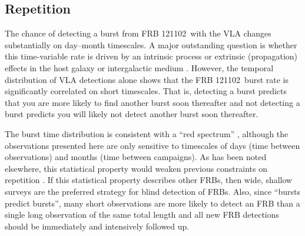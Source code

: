 \documentclass[twocolumn]{aastex61}
\newcommand{\frb}{FRB 121102}
\begin{document}

\subsection{Repetition}

The chance of detecting a burst from \frb\ with the VLA changes substantially on day--month timescales. A major outstanding question is whether this time-variable rate is driven by an intrinsic process \citep{2016ApJ...826..226K} or extrinsic (propagation) effects in the host galaxy or intergalactic medium \citep{CORDES}. However, the temporal distribution of VLA detections alone shows that the \frb\ burst rate is significantly correlated on short timescales. That is, detecting a burst predicts that you are more likely to find another burst soon thereafter and not detecting a burst predicts you will likely not detect another burst soon thereafter. 

The burst time distribution is consistent with a ``red spectrum'' \citep{2016MNRAS.458L..89C}, although the observations presented here are only sensitive to timescales of days (time between observations) and months (time between campaigns). As has been noted elsewhere, this statistical property would weaken previous constraints on repetition \citep{2015MNRAS.454..457P,2015ApJ...807...16L}. If this statistical property describes other FRBs, then wide, shallow surveys are the preferred strategy for blind detection of FRBs. Also, since ``bursts predict bursts'', many short observations are more likely to detect an FRB than a single long observation of the same total length and all new FRB detections should be immediately and intensively followed up.
\end{document}
